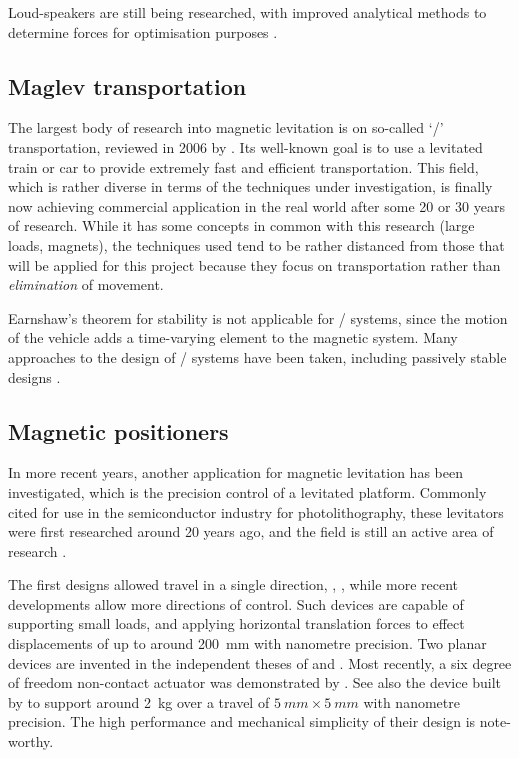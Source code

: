 Loud-speakers are still being researched, with improved analytical methods to determine forces for optimisation purposes \cite{merit2009}.

\subsection{Maglev transportation}

The largest body of research into magnetic levitation is on so-called `\maglev/'
transportation, reviewed in 2006 by \textcite{lee2006}.
Its well-known goal is to use a levitated train or car to
provide extremely fast and efficient transportation.
This field, which is
rather diverse in terms of the techniques under investigation, is finally now
achieving commercial application in the real world after some 20 or 30 years
of research.
While it has some concepts in common with this research (large
loads, magnets), the techniques used tend to be rather distanced from those
that will be applied for this project because they focus on transportation
rather than \emph{elimination} of movement.

Earnshaw's theorem for stability is not applicable for \maglev/ systems, since the motion of the vehicle adds a time-varying element to the magnetic system.
Many approaches to the design of \maglev/ systems have been taken, including passively stable designs \cite{musolino2009}.

\subsection{Magnetic positioners}

In more recent years, another application for magnetic levitation has been
investigated, which is the precision control of a levitated platform.
Commonly
cited for use in the semiconductor industry for photolithography, these
levitators were first researched around 20 years ago, and the field is still an active area of research \cite{fulford2008,fulford2009}.

The first designs allowed travel in a single direction, \eg,
\textcite{trumper1992}, while more recent developments allow more directions
of control.
Such devices are capable of supporting small loads, and applying
horizontal translation forces to effect displacements of up to around
\SI{200}{mm} with nanometre precision.
Two planar devices are invented in the
independent theses of \textcite{kim1997} and \textcite{molenaar2000}.
Most
recently, a six degree of freedom non-contact actuator was demonstrated by
\textcite{verma2004}.
See also the device built by \textcite{kim2007} to
support around \SI{2}{kg} over a travel of $\SI{5}{mm}\times\SI{5}{mm}$ with
nanometre precision.
The high performance and mechanical simplicity of their
design is note-worthy.


